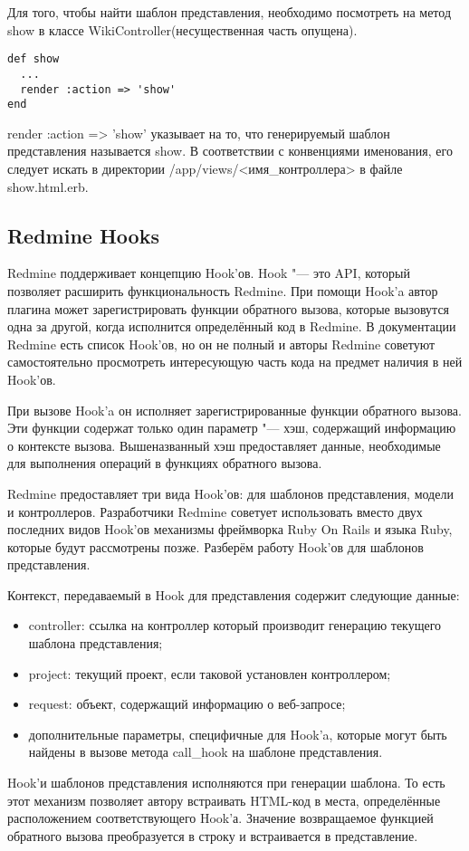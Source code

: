 Для того, чтобы найти шаблон представления, необходимо посмотреть на метод show
в классе WikiController(несущественная часть опущена).
\small{
\begin{lstlisting}
def show
  ...
  render :action => 'show'
end
\end{lstlisting}
}
render :action => 'show' указывает на то, что генерируемый шаблон представления
называется show. В соответствии с конвенциями именования, его следует искать в
директории /app/views/<имя\_контроллера> в файле show.html.erb.

\subsection{Redmine Hooks}
Redmine поддерживает концепцию Hook'ов. Hook "--- это API, который позволяет
расширить функциональность Redmine. При помощи Hook'a автор плагина может
зарегистрировать функции обратного вызова, которые вызовутся одна за другой,
когда исполнится определённый код в Redmine. В документации Redmine есть список
Hook'ов, но он не полный и авторы Redmine советуют самостоятельно просмотреть
интересующую часть кода на предмет наличия в ней Hook'ов.

При вызове Hook'a он исполняет зарегистрированные функции обратного вызова. Эти
функции содержат только один параметр "--- хэш, содержащий информацию
о контексте вызова. Вышеназванный хэш предоставляет данные, необходимые для
выполнения операций в функциях обратного вызова.

Redmine предоставляет три вида Hook'ов: для шаблонов представления, модели и
контроллеров. Разработчики Redmine советует использовать вместо двух последних
видов Hook'ов механизмы фреймворка Ruby On Rails и языка Ruby, которые будут
рассмотрены позже. Разберём работу Hook'ов для шаблонов представления.

Контекст, передаваемый в Hook для представления содержит следующие данные:
\begin{itemize}
  \item controller: ссылка на контроллер который производит генерацию
  текущего шаблона представления;
  \item project: текущий проект, если таковой установлен контроллером;
  \item request: объект, содержащий информацию о веб-запросе;
  \item дополнительные параметры, специфичные для Hook'a, которые могут
  быть найдены в вызове метода call\_hook на шаблоне представления.
\end{itemize}
Hook'и шаблонов представления исполняются при генерации шаблона. То есть этот
механизм позволяет автору встраивать HTML-код в места, определённые
расположением соответствующего Hook'а. Значение возвращаемое функцией обратного
вызова преобразуется в строку и встраивается в представление.

